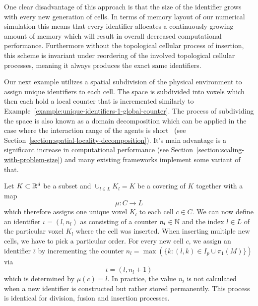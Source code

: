 One clear disadvantage of this approach is that the size of the identifier grows with every new
generation of cells.
In terms of memory layout of our numerical simulation this means that every identifier allocates a
continuously growing amount of memory which will result in overall decreased computational
performance.
Furthermore without the topological cellular process of insertion, this scheme is invariant under
reordering of the involved topological cellular processes, meaning it always produces the exact same
identifiers.

Our next example utilizes a spatial subdivision of the physical environment to assign unique
identifiers to each cell.
The space is subdivided into voxels which then each hold a local counter that is incremented
similarly to Example~\ref{example:unique-identifiers-1-global-counter}.
The process of subdividing the space is also known as a domain decomposition which can be applied in
the case where the interaction range of the agents is short~\cite{Brown2011} (see
Section~\ref{section:spatial-locality-decomposition}).
It's main advantage is a significant increase in computational performance (see
Section~\ref{section:scaling-with-problem-size}) and many existing frameworks implement some variant
of that.

\begin{example}
    Let $K\subset\mathbb{R}^d$ be a subset and $\cup_{l\in L}K_l=K$ be a covering
    of $K$ together with a map
    \begin{equation}
        \mu:C\rightarrow L
    \end{equation}
    which therefore assigns one unique voxel $K_l$ to each cell $c\in C$.
    We can now define an identifier $\iota=(l,n_l)$ as consisting of a counter $n_l\in\mathbb{N}$ and the
    index $l\in L$ of the particular voxel $K_l$ where the cell was inserted.
    When inserting multiple new cells, we have to pick a particular order.
    For every new cell $c$, we assign an identifier $\bar{\iota}$ by incrementing the counter
    $n_l=\max(\{k:(l,k)\in I_p\cup\pi_1(M)\})$ via
    \begin{equation}
        \bar{\iota} = (l,n_l+1)
    \end{equation}
    which is determined by $\mu(c)=l$.
    In practice, the value $n_l$ is not calculated when a new identifier is constructed but rather
    stored permanently.
    This process is identical for division, fusion and insertion processes.
    \label{example:unique-identifiers-3-spatial-subdivisions}
\end{example}

